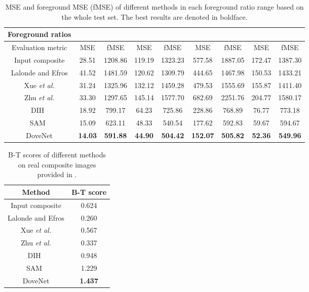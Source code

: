 \documentclass[10pt,twocolumn,letterpaper]{article}
\begin{document}
\setlength{\tabcolsep}{8pt}
\begin{table*}[tb]
\centering
\begin{tabular}{|l|c|c|c|c|c|c|c|c|}
\hline
\multicolumn{1}{|c|}{Foreground ratios} & \multicolumn{2}{c|}{} & \multicolumn{2}{c|}{} & \multicolumn{2}{c|}{} & \multicolumn{2}{c|}{}\\ \hline
\multicolumn{1}{|c|}{Evaluation metric} & MSE & fMSE & MSE & fMSE & MSE & fMSE & MSE & fMSE \\ \hline
\multicolumn{1}{|c|}{Input composite} & 28.51 & 1208.86 & 119.19 & 1323.23 & 577.58 & 1887.05 & 172.47 & 1387.30 \\ \hline
\multicolumn{1}{|c|}{Lalonde and Efros\cite{lalonde2007using}} & 41.52 & 1481.59 & 120.62 & 1309.79 & 444.65 & 1467.98 & 150.53 & 1433.21 \\ \hline
\multicolumn{1}{|c|}{Xue \emph{et al.}\cite{xue2012understanding}} & 31.24 & 1325.96 & 132.12 & 1459.28 & 479.53 & 1555.69 & 155.87 & 1411.40 \\ \hline
\multicolumn{1}{|c|}{Zhu \emph{et al.}\cite{zhu2015learning}} & 33.30 & 1297.65 & 145.14 & 1577.70 & 682.69 & 2251.76 & 204.77 & 1580.17 \\ \hline
\multicolumn{1}{|c|}{DIH~\cite{tsai2017deep}} & 18.92 & 799.17 & 64.23 & 725.86 & 228.86 & 768.89 & 76.77 & 773.18 \\ \hline
\multicolumn{1}{|c|}{SAM~\cite{xiaodong2019improving}} & 15.09 & 623.11 & 48.33 & 540.54 & 177.62 & 592.83 & 59.67 & 594.67 \\ \hline
\multicolumn{1}{|c|}{DoveNet} & \bf14.03 & \bf591.88 & \bf44.90 & \bf504.42 & \bf152.07 & \bf505.82 & \bf52.36 & \bf549.96 \\ \hline
\end{tabular}
\caption{MSE and foreground MSE (fMSE) of different methods in each foreground ratio range based on the whole test set. The best results are denoted in boldface.}
\label{tab:ablate_ratio}
\end{table*}


\setlength{\tabcolsep}{10pt}
\begin{table}
\centering
\begin{tabular}{|c|c|}
\hline
Method & B-T score\\\hline
Input composite & 0.624 \\ \hline
Lalonde and Efros \cite{lalonde2007using} & 0.260 \\ \hline
Xue \emph{et al.} \cite{xue2012understanding} & 0.567 \\ \hline
Zhu \emph{et al.} \cite{zhu2015learning} & 0.337 \\ \hline
DIH~\cite{tsai2017deep} & 0.948 \\ \hline
SAM~\cite{xiaodong2019improving} & 1.229 \\ \hline
DoveNet & \bf1.437 \\ \hline
\end{tabular}
\caption{B-T scores of different methods on  real composite images provided in \cite{tsai2017deep}. }
\vspace{-5pt}
\label{tab:BT_score}
\end{table}
\end{document}
